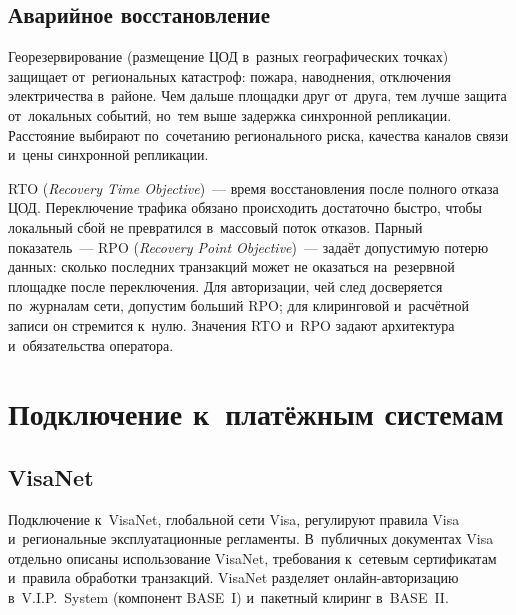 
\subsection*{Аварийное восстановление}

Георезервирование (размещение ЦОД в~разных географических точках) защищает
от~региональных катастроф: пожара, наводнения, отключения электричества
в~районе. Чем дальше площадки друг от~друга, тем лучше защита от~локальных
событий, но~тем выше задержка синхронной репликации. Расстояние выбирают
по~сочетанию регионального риска, качества каналов связи и~цены
синхронной репликации.

RTO (\textit{Recovery Time Objective})~--- время восстановления после полного
отказа ЦОД. Переключение трафика обязано происходить достаточно быстро, чтобы
локальный сбой не превратился в~массовый поток отказов. Парный показатель~---
RPO (\textit{Recovery Point Objective})~--- задаёт допустимую потерю данных:
сколько последних транзакций может не оказаться на~резервной площадке после
переключения. Для авторизации, чей след досверяется по~журналам сети, допустим
больший RPO; для клиринговой и~расчётной записи он стремится к~нулю. Значения
RTO и~RPO задают архитектура и~обязательства оператора.

\section{Подключение к~платёжным системам}\label{sec:pc-connectivity}

\subsection*{VisaNet}

Подключение к~VisaNet, глобальной сети Visa, регулируют правила Visa
и~региональные эксплуатационные регламенты. В~публичных документах Visa
отдельно описаны использование VisaNet, требования к~сетевым сертификатам
и~правила обработки транзакций. VisaNet разделяет онлайн-авторизацию в~V.I.P.~System (компонент BASE~I)
и~пакетный клиринг в~BASE~II.~\cite{visa-core-rules}

